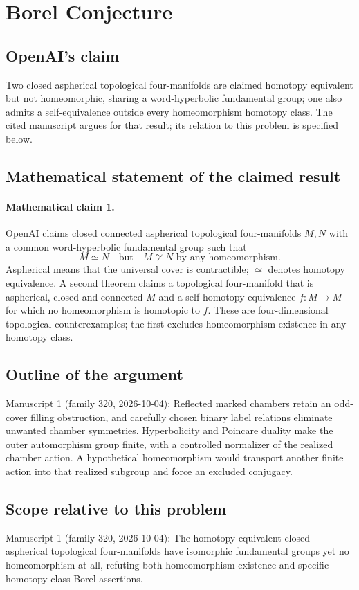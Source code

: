 \documentclass[11pt]{article}
\begin{document}
\section*{Borel Conjecture}

\subsection{OpenAI's claim}
Two closed aspherical topological four-manifolds are claimed homotopy equivalent but not homeomorphic, sharing a word-hyperbolic fundamental group; one also admits a self-equivalence outside every homeomorphism homotopy class. The cited manuscript argues for that result; its relation to this problem is specified below.

\subsection{Mathematical statement of the claimed result}
\paragraph{Mathematical claim 1.} OpenAI claims closed connected aspherical topological four-manifolds $M,N$ with a common word-hyperbolic fundamental group such that
\[
M\simeq N\quad\text{but}\quad M\not\cong N\text{ by any homeomorphism}.
\]
Aspherical means that the universal cover is contractible; $\simeq$ denotes homotopy equivalence. A second theorem claims a topological four-manifold that is aspherical, closed and connected $M$ and a self homotopy equivalence $f:M\to M$ for which no homeomorphism is homotopic to $f$. These are four-dimensional topological counterexamples; the first excludes homeomorphism existence in any homotopy class.

\subsection{Outline of the argument}
Manuscript 1 (family 320, 2026-10-04): Reflected marked chambers retain an odd-cover filling obstruction, and carefully chosen binary label relations eliminate unwanted chamber symmetries. Hyperbolicity and Poincare duality make the outer automorphism group finite, with a controlled normalizer of the realized chamber action. A hypothetical homeomorphism would transport another finite action into that realized subgroup and force an excluded conjugacy.

\subsection{Scope relative to this problem}
Manuscript 1 (family 320, 2026-10-04): The homotopy-equivalent closed aspherical topological four-manifolds have isomorphic fundamental groups yet no homeomorphism at all, refuting both homeomorphism-existence and specific-homotopy-class Borel assertions.
\end{document}
